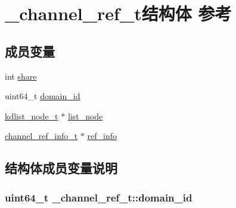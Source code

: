 \hypertarget{a00007}{}\section{\+\_\+channel\+\_\+ref\+\_\+t结构体 参考}
\label{a00007}
\subsection*{成员变量}
\begin{DoxyCompactItemize}
\item 
int \hyperlink{a00007_a6fbc267d43e4e1b98e5dbbbd25fc77f5_a6fbc267d43e4e1b98e5dbbbd25fc77f5}{share}
\item 
uint64\+\_\+t \hyperlink{a00007_a2d8872b940a96f84e2f704ac3d4a1197_a2d8872b940a96f84e2f704ac3d4a1197}{domain\+\_\+id}
\item 
\hyperlink{a00053_ac701f00a0851c97467ae35c382b316b7_ac701f00a0851c97467ae35c382b316b7}{kdlist\+\_\+node\+\_\+t} $\ast$ \hyperlink{a00007_a57f667254f0f5d0fea05d491f220d5ff_a57f667254f0f5d0fea05d491f220d5ff}{list\+\_\+node}
\item 
\hyperlink{a00050_a3c8048d6abb647710be83f9b243c7822_a3c8048d6abb647710be83f9b243c7822}{channel\+\_\+ref\+\_\+info\+\_\+t} $\ast$ \hyperlink{a00007_ab5214b13df76bc824cd4c590976fe804_ab5214b13df76bc824cd4c590976fe804}{ref\+\_\+info}
\end{DoxyCompactItemize}


\subsection{结构体成员变量说明}
\hypertarget{a00007_a2d8872b940a96f84e2f704ac3d4a1197_a2d8872b940a96f84e2f704ac3d4a1197}{}
\subsubsection[{domain\+\_\+id}]{\setlength{\rightskip}{0pt plus 5cm}uint64\+\_\+t \+\_\+channel\+\_\+ref\+\_\+t\+::domain\+\_\+id}\label{a00007_a2d8872b940a96f84e2f704ac3d4a1197_a2d8872b940a96f84e2f704ac3d4a1197}
\hypertarget{a00007_a57f667254f0f5d0fea05d491f220d5ff_a57f667254f0f5d0fea05d491f220d5ff}{}
